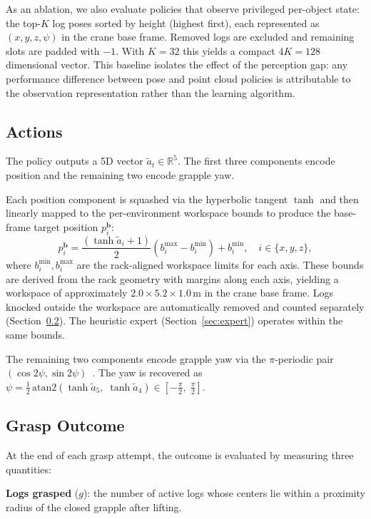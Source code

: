 \documentclass[letterpaper, 10 pt, conference]{ieeeconf}
\begin{document}
As an ablation, we also evaluate policies that observe privileged per-object state: the top-$K$ log poses sorted by height (highest first), each represented as $(x,y,z,\psi)$ in the crane base frame.
Removed logs are excluded and remaining slots are padded with $-1$.
With $K\!=\!32$ this yields a compact $4K = 128$ dimensional vector.
This baseline isolates the effect of the perception gap: any performance difference between pose and point cloud policies is attributable to the observation representation rather than the learning algorithm.

\subsection{Actions}
\label{sec:actions}
The policy outputs a 5D vector $\tilde{a}_t \in \mathbb{R}^5$.
The first three components encode position and the remaining two encode grapple yaw.

Each position component is squashed via the hyperbolic tangent $\tanh$ and then linearly mapped to the per-environment workspace bounds to produce the base-frame target position $p^{\mathbf{b}}_i$:
\begin{equation}
    p^{\mathbf{b}}_i = \frac{(\tanh \tilde{a}_i + 1)}{2}(b_i^{\max} - b_i^{\min}) + b_i^{\min}, \quad i \in \{x,y,z\},
\end{equation}
where $b_i^{\min}, b_i^{\max}$ are the rack-aligned workspace limits for each axis.
These bounds are derived from the rack geometry with margins along each axis, yielding a workspace of approximately $2.0 \times 5.2 \times 1.0$\,m in the crane base frame.
Logs knocked outside the workspace are automatically removed and counted separately (Section~\ref{sec:outcome}). The heuristic expert (Section~\ref{sec:expert}) operates within the same bounds.

The remaining two components encode grapple yaw via the $\pi$-periodic pair $(\cos 2\psi, \sin 2\psi)$~\cite{morrison2018closing}. The yaw is recovered as $\psi = \tfrac{1}{2}\,\mathrm{atan2}(\tanh \tilde{a}_5,\;\tanh \tilde{a}_4) \in [-\tfrac{\pi}{2},\;\tfrac{\pi}{2}]$.

\subsection{Grasp Outcome}
\label{sec:outcome}
At the end of each grasp attempt, the outcome is evaluated by measuring three quantities:

\textbf{Logs grasped} ($g$): the number of active logs whose centers lie within a proximity radius of the closed grapple after lifting.
\end{document}
